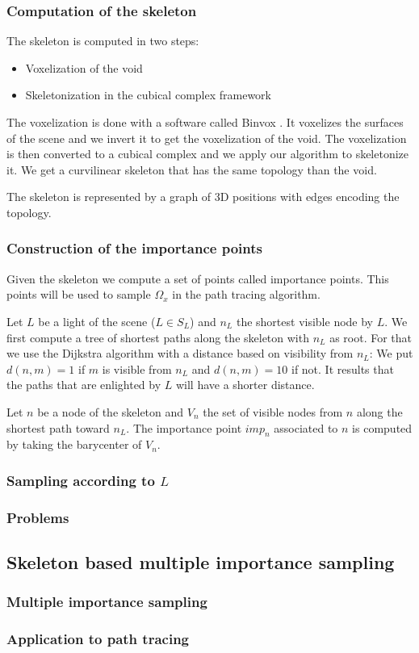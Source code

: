 \subsubsection{Computation of the skeleton}

The skeleton is computed in two steps:

\begin{itemize}
\item Voxelization of the void
\item Skeletonization in the cubical complex framework
\end{itemize}

The voxelization is done with a software called \of Binvox \fg. It voxelizes the surfaces of the scene and we invert it to get the voxelization of the void. The voxelization is then converted to a cubical complex and we apply our algorithm to skeletonize it. We get a curvilinear skeleton that has the same topology than the void.

The skeleton is represented by a graph of 3D positions with edges encoding the topology.

\subsubsection{Construction of the importance points}

Given the skeleton we compute a set of points called importance points. This points will be used to sample $\Omega_x$ in the path tracing algorithm.

Let $L$ be a light of the scene ($L \in S_L$) and $n_L$ the shortest visible node by $L$. We first compute a tree of shortest paths along the skeleton with $n_L$ as root. For that we use the Dijkstra algorithm with a distance based on visibility from $n_L$: We put $d(n, m) = 1$ if $m$ is visible from $n_L$ and $d(n, m) = 10$ if not. It results that the paths that are enlighted by $L$ will have a shorter distance.

Let $n$ be a node of the skeleton and $V_n$ the set of visible nodes from $n$ along the shortest path toward $n_L$. The importance point $imp_n$ associated to $n$ is computed by taking the barycenter of $V_n$.

\subsubsection{Sampling according to $L$}

\subsubsection{Problems}

\subsection{Skeleton based multiple importance sampling}

\subsubsection{Multiple importance sampling}

\subsubsection{Application to path tracing}
